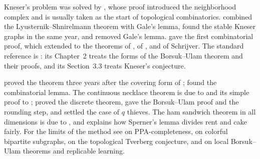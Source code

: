 \begin{refsection}
\notesandrefs

Kneser's problem \parencite{Kneser1955} was solved by \textcite{Lovasz1978}, whose proof introduced the neighborhood complex and is usually taken as the start of topological combinatorics. \textcite{Barany1978} combined the Lyusternik--Shnirelmann theorem with Gale's lemma, \textcite{Schrijver1978} found the stable Kneser graphs in the same year, and \textcite{Greene2002} removed Gale's lemma. \textcite{Matousek2004} gave the first combinatorial proof, which \textcite{Ziegler2002} extended to the theorems of \textcite{Dolnikov1988}, of \textcite{AlonFranklLovasz1986}, and of Schrijver. The standard reference is \textcite{Matousek2003}: its Chapter~2 treats the forms of the Borsuk--Ulam theorem and their proofs, and its Section~3.3 treats Kneser's conjecture.

\textcite{Borsuk1933} proved the theorem three years after the covering form of \textcite{LyusternikShnirelmann1930}; \textcite{Tucker1946} found the combinatorial lemma. The continuous necklace theorem is due to \textcite{HobbyRice1965} and its simple proof to \textcite{Pinkus1976}; \textcite{GoldbergWest1985} proved the discrete theorem, \textcite{AlonWest1986} gave the Borsuk--Ulam proof and the rounding step, and \textcite{Alon1987} settled the case of $q$ thieves. The ham sandwich theorem in all dimensions is due to \textcite{StoneTukey1942}, and \textcite{Su1999} explains how Sperner's lemma divides rent and cake fairly. For the limits of the method see \textcite{FilosRatsikasGoldberg2019} on PPA-completeness, \textcite{SimonyiTardos2006} on colorful bipartite subgraphs, \textcite{Frick2015} on the topological Tverberg conjecture, and \textcite{ChaseEtAl2024} on local Borsuk--Ulam theorems and replicable learning.

\printchapterbib
\end{refsection}
